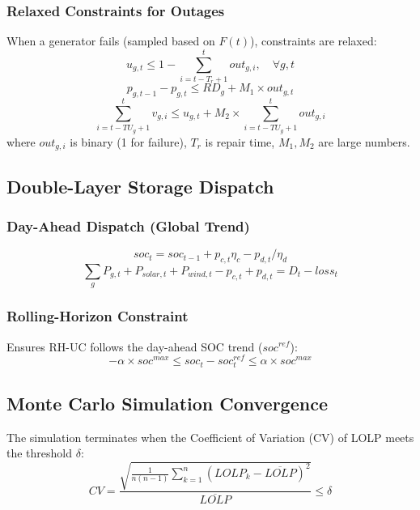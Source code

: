 \documentclass{article}
\begin{document}
\subsubsection{Relaxed Constraints for Outages}
When a generator fails (sampled based on $F(t)$), constraints are relaxed:
\begin{equation}
u_{g,t} \leq 1 - \sum_{i=t-T_r+1}^{t} out_{g,i}, \quad \forall g, t
\end{equation}
\begin{equation}
p_{g,t-1} - p_{g,t} \leq RD_g + M_1 \times out_{g,t}
\end{equation}
\begin{equation}
\sum_{i=t-TU_g+1}^{t} v_{g,i} \leq u_{g,t} + M_2 \times \sum_{i=t-TU_g+1}^{t} out_{g,i}
\end{equation}
where $out_{g,i}$ is binary (1 for failure), $T_r$ is repair time, $M_1, M_2$ are large numbers.

\subsection{Double-Layer Storage Dispatch}
\subsubsection{Day-Ahead Dispatch (Global Trend)}
\begin{equation}
soc_t = soc_{t-1} + p_{c,t} \eta_c - p_{d,t} / \eta_d
\end{equation}
\begin{equation}
\sum_{g} P_{g,t} + P_{solar,t} + P_{wind,t} - p_{c,t} + p_{d,t} = D_t - loss_t
\end{equation}

\subsubsection{Rolling-Horizon Constraint}
Ensures RH-UC follows the day-ahead SOC trend ($soc^{ref}$):
\begin{equation}
-\alpha \times soc^{max} \leq soc_t - soc^{ref}_t \leq \alpha \times soc^{max}
\end{equation}

\subsection{Monte Carlo Simulation Convergence}
The simulation terminates when the Coefficient of Variation (CV) of LOLP meets the threshold $\delta$:
\begin{equation}
CV = \frac{\sqrt{\frac{1}{n(n-1)} \sum_{k=1}^{n} (LOLP_k - \overline{LOLP})^2}}{\overline{LOLP}} \leq \delta
\end{equation}
\end{document}
